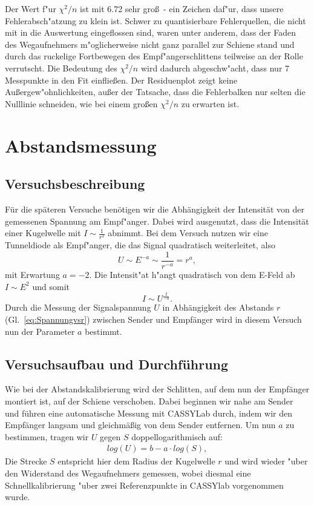 \documentclass[12pt,a4paper]{article}
\begin{document}
Der Wert f"ur $\chi^2/n$ ist mit 6.72 sehr gro\ss\ -  ein Zeichen daf"ur, dass unsere Fehlerabsch"atzung zu klein ist. Schwer zu quantisierbare Fehlerquellen, die nicht mit in die Auswertung eingeflossen sind, waren unter anderem, dass der Faden des Wegaufnehmers m"oglicherweise nicht ganz parallel zur Schiene stand und durch das ruckelige Fortbewegen des Empf"angerschlittens teilweise an der Rolle verrutscht. Die Bedeutung des $\chi^2/n$ wird dadurch abgeschw"acht, dass nur 7 Messpunkte in den Fit einflie\ss en. Der Residuenplot zeigt keine Au\ss ergew"ohnlichkeiten, au\ss er der Tatsache, dass die Fehlerbalken nur selten die Nulllinie schneiden, wie bei einem gro\ss en $\chi^2/n$ zu erwarten ist.
\newpage




\section{Abstandsmessung}
\subsection{Versuchsbeschreibung}
Für die späteren Versuche benötigen wir die Abhängigkeit der Intensität von der gemessenen Spannung am Empf"anger.
Dabei wird ausgenutzt, dass die Intensität einer Kugelwelle mit $I\sim\frac{1}{r^2}$ abnimmt. Bei dem Versuch nutzen wir eine Tunneldiode als Empf"anger, die das Signal quadratisch weiterleitet, also
\begin{equation}\label{eq:Spannungvsr}
U\sim E^{-a}\sim\frac{1}{r^{-a}}=r^a,
\end{equation}
mit Erwartung $a=-2$. Die Intensit"at h"angt quadratisch von dem E-Feld ab $I\sim E^2$ und somit 
\begin{equation}
I \sim U^{\frac{2}{-a}}.
\end{equation}
Durch die Messung der Signalspannung $U$ in Abhängigkeit des Abstands $r$ (Gl.~\eqref{eq:Spannungvsr}) zwischen Sender und Empfänger wird in diesem Versuch nun der Parameter $a$ bestimmt.
\subsection{Versuchsaufbau und Durchführung}
Wie bei der Abstandskalibrierung wird der Schlitten, auf dem nun der Empfänger montiert ist, auf der Schiene verschoben. Dabei beginnen wir nahe am Sender und führen eine automatische Messung mit CASSYLab durch, indem wir den Empfänger langsam und gleichmäßig von dem Sender entfernen. Um nun $a$ zu bestimmen, tragen wir $U$ gegen $S$ doppellogarithmisch auf:
\begin{align*}
log(U)=b-a\cdot log(S),
\end{align*}
Die Strecke $S$ entspricht hier dem Radius der Kugelwelle $r$ und wird wieder "uber den Widerstand des Wegaufnehmers gemessen, wobei diesmal eine Schnellkalibrierung "uber zwei Referenzpunkte in CASSYlab vorgenommen wurde. 
\end{document}
